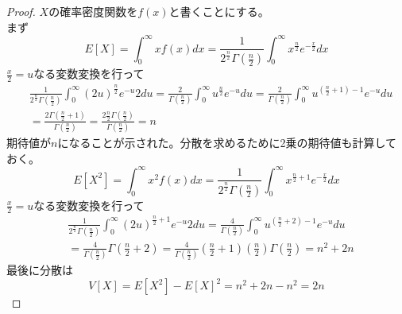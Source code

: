         \begin{proof}
            \quad\par
            $X$の確率密度関数を$f(x)$と書くことにする。\\
            まず
            \[E[X] = \int_{0}^{\infty}{xf(x) dx} = \frac{1}{2^{\frac{n}{2}}\Gamma{\left(\frac{n}{2}\right)}}\int_0^{\infty}{x^{\frac{n}{2}}e^{-\frac{x}{2}} dx}\]
            $\frac{x}{2} = u$なる変数変換を行って
            \begin{align*}
                & \frac{1}{2^{\frac{n}{2}}\Gamma\left(\frac{n}{2}\right)}\int_0^{\infty}{(2u)^{\frac{n}{2}}e^{-u} 2du} = \frac{2}{\Gamma{\left(\frac{n}{2}\right)}}\int_0^{\infty}{u^{\frac{n}{2}}e^{-u} du} = \frac{2}{\Gamma{\left(\frac{n}{2}\right)}}\int_0^{\infty}{u^{\left(\frac{n}{2}+1\right)-1}e^{-u} du}\\
                &= \frac{2\Gamma{\left(\frac{n}{2}+1\right)}}{\Gamma{\left(\frac{n}{2}\right)}} =  \frac{2\frac{n}{2}\Gamma{\left(\frac{n}{2}\right)}}{\Gamma{\left(\frac{n}{2}\right)}} = n
            \end{align*}
            期待値が$n$になることが示された。分散を求めるために2乗の期待値も計算しておく。
            \[E[X^2] = \int_{0}^{\infty}{x^2f(x) dx} = \frac{1}{2^{\frac{n}{2}}\Gamma{\left(\frac{n}{2}\right)}}\int_0^{\infty}{x^{\frac{n}{2}+1}e^{-\frac{x}{2}} dx}\]
            $\frac{x}{2} = u$なる変数変換を行って
            \begin{align*}
                &\frac{1}{2^{\frac{n}{2}}\Gamma{\left(\frac{n}{2}\right)}}\int_0^{\infty}{(2u)^{\frac{n}{2}+1}e^{-u} 2du} = \frac{4}{\Gamma{\left(\frac{n}{2}\right)}}\int_0^{\infty}{u^{\left(\frac{n}{2}+2\right)-1}e^{-u} du}\\
                &= \frac{4}{\Gamma{\left(\frac{n}{2}\right)}}\Gamma{\left(\frac{n}{2}+2\right)} = \frac{4}{\Gamma{\left(\frac{n}{2}\right)}}\left(\frac{n}{2}+1\right)\left(\frac{n}{2}\right)\Gamma{\left(\frac{n}{2}\right)} = n^2+2n
            \end{align*}
            最後に分散は
            \[V[X] = E[X^2] - {E[X]}^2 = n^2+2n-n^2 = 2n\]
        \end{proof}
